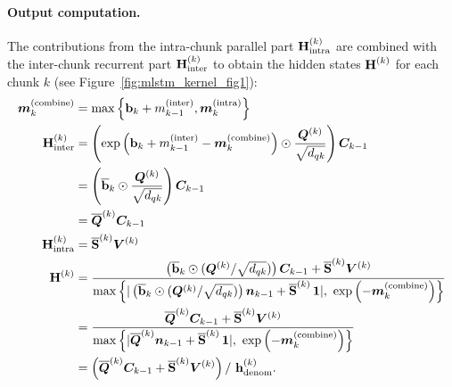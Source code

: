\documentclass{article}
\newcommand{\minter}{{m}^{(\text{inter})}}
\newcommand{\mintra}{\bm{m}^{(\text{intra})}}
\newcommand{\mcombine}{\bm{m}^{(\text{combine})}}
\newcommand{\Hinter}{\bm{\rH}_{\text{inter}}}
\newcommand{\Hintra}{\bm{\rH}_{\text{intra}}}
\begin{document}
    \paragraph{Output computation.} The contributions from the intra-chunk parallel part $\Hintra^{(k)}$ are combined with the inter-chunk recurrent part $\Hinter^{(k)}$ to obtain the hidden states $\bm{\mathrm{H}}^{(k)}$ for each chunk $k$ (see Figure~\ref{fig:mlstm_kernel_fig1}):
    \begin{align}
        \mcombine_k    & = \max \left\{ \bm{\Rb}_k + \minter_{k-1}, \mintra_k \right\}                                                                                                           \\
        \Hinter^{(k)}  & = \left( \exp \left( \bm{\Rb}_k + \minter_{k-1} - \mcombine_k \right) \odot \frac{\BQ^{(k)}}{\sqrt{d_{qk}}} \right) \BC_{k-1}                                           \\
                       & = \left( \overline{\bm{\Rb}}_k \odot \frac{\BQ^{(k)}}{\sqrt{d_{qk}}} \right) \BC_{k-1}                                                                                  \\
                       & = \overline{\BQ}^{(k)} \BC_{k-1}                                                                                                                                        \\
        \Hintra^{(k)}  & = \overline{\bm{\rS}}^{(k)} \BV^{(k)}                                                                                                                                   \\
        \bm{\rH}^{(k)} & = \frac{\left( \overline{\bm{\Rb}}_k \odot (\BQ^{(k)} / \sqrt{d_{qk}} ) \right) \BC_{k-1} + \overline{\bm{\rS}}^{(k)} \BV^{(k)}}
        {\max \left\{|\left( \overline{\bm{\Rb}}_k \odot (\BQ^{(k)} / \sqrt{d_{qk}} ) \right) \bm{n}_{k-1} + \overline{\bm{\rS}}^{(k)} \, \bm{1}|, \, \, \exp \left(-\mcombine_k\right)\right\}} \\
                       & = \frac{\overline{\BQ}^{(k)} \BC_{k-1} + \overline{\bm{\rS}}^{(k)} \BV^{(k)}}
        {\max \left\{|\overline{\BQ}^{(k)} \bm{n}_{k-1} + \overline{\bm{\rS}}^{(k)} \, \bm{1}|, \, \, \exp \left(-\mcombine_k\right)\right\}}                                                    \\
                       & = \left({\overline{\BQ}^{(k)} \BC_{k-1} + \overline{\bm{\rS}}^{(k)} \BV^{(k)}}\right) / \
        {\bm{\Rh}^{(k)}_{\text{denom}}}.
    \end{align}
\end{document}
